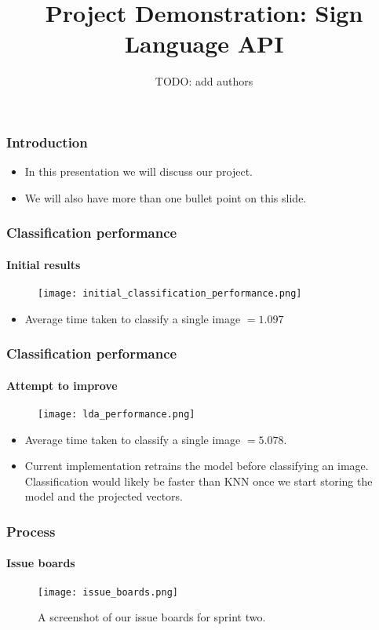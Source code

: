 \documentclass{beamer}
\title{Project Demonstration: Sign Language API}
\author{TODO: add authors}
\date{}
\begin{document}
\begin{frame}[t]
	\titlepage
\end{frame}

\begin{frame}[t]
	\frametitle{Introduction}
	\begin{itemize}
		\item In this presentation we will discuss our project.
		\item We will also have more than one bullet point on this slide.
	\end{itemize}
\end{frame}

\begin{frame}[t]
	\frametitle{Classification performance}
	\framesubtitle{Initial results}
	\begin{figure}
		\texttt{[image: initial\_classification\_performance.png]}
	\end{figure}
	\begin{itemize}
		\item Average time taken to classify a single image $= 1.097$
	\end{itemize}
	
\end{frame}

\begin{frame}[t]
	\frametitle{Classification performance}
	\framesubtitle{Attempt to improve}
		\begin{figure}
			\texttt{[image: lda\_performance.png]}
		\end{figure}
			\begin{itemize}
				\item Average time taken to classify a single image $ = 5.078$.
				\item Current implementation retrains the model before classifying an image. Classification 
					would likely be faster than KNN once we start storing the model and the projected
					vectors.
			\end{itemize}
\end{frame}


\begin{frame}[t]
	\frametitle{Process}
	\framesubtitle{Issue boards}
	\begin{figure}
		\texttt{[image: issue\_boards.png]}
		\caption{A screenshot of our issue boards for sprint two.}
	\end{figure}
\end{frame}
\end{document}
